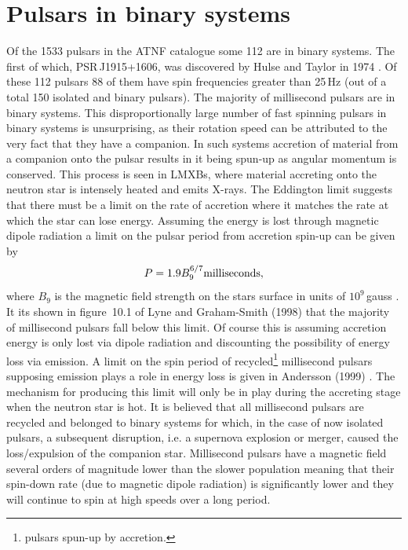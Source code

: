 \section{Pulsars in binary systems}\label{Binaries}
Of the 1533 pulsars in the ATNF catalogue some 112 are in binary systems. The first of which,
PSR\,J1915+1606, was discovered by Hulse and Taylor in 1974 \cite{HulseTaylor:1975}. Of these 112
pulsars 88 of them have spin frequencies greater than 25\,Hz (out of a total 150 isolated and binary
pulsars). The majority of millisecond pulsars are in binary systems. This disproportionally large
number of fast spinning pulsars in binary systems is unsurprising, as their rotation speed can be
attributed to the very fact that they have a companion. In such systems accretion of material from a
companion onto the pulsar results in it being spun-up as angular momentum is conserved. This process
is seen in LMXBs, where material accreting onto the neutron star is intensely heated and emits
X-rays. The Eddington limit suggests that there must be a limit on the rate of accretion where it
matches the rate at which the star can lose energy. Assuming the energy is lost through magnetic
dipole radiation a limit on the pulsar period from accretion spin-up can be given by
\begin{equation}
P = 1.9B_9^{6/7} \rm{milliseconds},
\end{equation}
where $B_9$ is the magnetic field strength on the stars surface in units of $10^9$\,gauss
\cite{PulsarAstronomy}. It its shown in figure~10.1 of Lyne and Graham-Smith (1998)
\cite{PulsarAstronomy} that the majority of millisecond pulsars fall below this limit. Of course
this is assuming accretion energy is only lost via dipole radiation and discounting the possibility
of energy loss via \gw emission. A limit on the spin period of recycled\footnote{pulsars spun-up by
accretion.} millisecond pulsars supposing \gw emission plays a role in energy loss is given in
Andersson (1999) \cite{Andersson:1999}. The mechanism for producing this limit will only be in play
during the accreting stage when the neutron star is hot. It is believed that all millisecond pulsars
are recycled and belonged to binary systems for which, in the case of now isolated pulsars, a
subsequent disruption, i.e. a supernova explosion or merger, caused the loss/expulsion of the
companion star. Millisecond pulsars have a magnetic field several orders of magnitude lower than the
slower population meaning that their spin-down rate (due to magnetic dipole radiation) is
significantly lower and they will continue to spin at high speeds over a long period.

